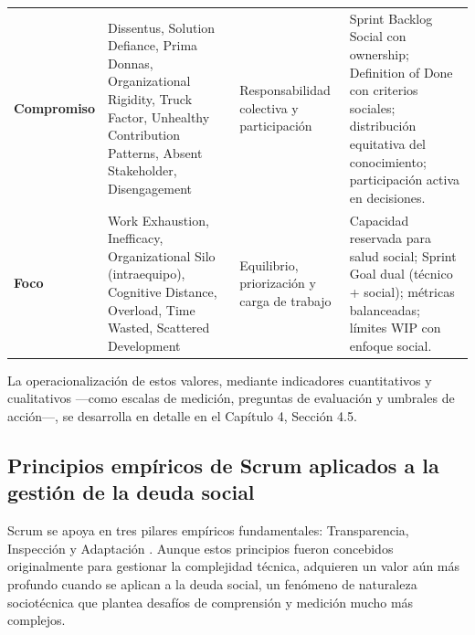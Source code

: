 \begin{table}[!htbp]
\begin{tabular}{@{}p{2.2cm}p{4.2cm}p{3.2cm}p{4.3cm}@{}}
        \textbf{Compromiso}                                                                                                                                   &
        Dissentus, Solution Defiance, Prima Donnas, Organizational Rigidity, Truck Factor, Unhealthy Contribution Patterns, Absent Stakeholder, Disengagement &
        Responsabilidad colectiva y participación                                                                                                             &
        Sprint Backlog Social con ownership; Definition of Done con criterios sociales; distribución equitativa del conocimiento; participación activa en decisiones.                                                                                                 \\
        \addlinespace

        \textbf{Foco}                                                                                                                                         &
        Work Exhaustion, Inefficacy, Organizational Silo (intraequipo), Cognitive Distance, Overload, Time Wasted, Scattered Development                      &
        Equilibrio, priorización y carga de trabajo                                                                                                           &
        Capacidad reservada para salud social; Sprint Goal dual (técnico + social); métricas balanceadas; límites WIP con enfoque social.                                                                                                                             \\
        \bottomrule
    \end{tabular}
\end{table}

La operacionalización de estos valores, mediante indicadores cuantitativos y cualitativos —como escalas de medición, preguntas de evaluación y umbrales de acción—, se desarrolla en detalle en el Capítulo 4, Sección 4.5.

\FloatBarrier

\subsection{Principios empíricos de Scrum aplicados a la gestión de la deuda social}

Scrum se apoya en tres pilares empíricos fundamentales: Transparencia, Inspección y Adaptación \cite{schwaber2020scrum}.
Aunque estos principios fueron concebidos originalmente para gestionar la complejidad técnica, adquieren un valor aún más profundo cuando se aplican a la deuda social, un fenómeno de naturaleza sociotécnica que plantea desafíos de comprensión y medición mucho más complejos.

